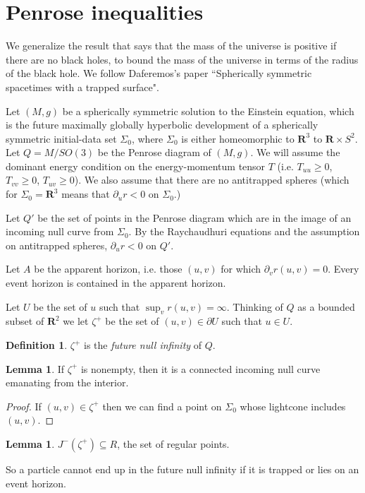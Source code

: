 \documentclass[12pt]{report}
\newcommand{\RR}{\mathbf{R}}
\newcommand{\dfn}[1]{\emph{#1}\index{#1}}
\theoremstyle{definition}
\newtheorem{lemma}[theorem]{Lemma}
\newtheorem{definition}[theorem]{Definition}
\theoremstyle{remark}
\begin{document}
\section{Penrose inequalities}
We generalize the result that says that the mass of the universe is positive if there are no black holes, to bound the mass of the universe in terms of the radius of the black hole. We follow Daferemos's paper ``Spherically symmetric spacetimes with a trapped surface".

Let $(M, g)$ be a spherically symmetric solution to the Einstein equation, which is the future maximally globally hyperbolic development of a spherically symmetric initial-data set $\Sigma_0$, where $\Sigma_0$ is either homeomorphic to $\RR^3$ to $\RR \times S^2$. Let $Q = M/SO(3)$ be the Penrose diagram of $(M, g)$. We will assume the dominant energy condition on the energy-momentum tensor $T$ (i.e. $T_{uu} \geq 0$, $T_{vv} \geq 0$, $T_{uv} \geq 0$). We also assume that there are no antitrapped spheres (which for $\Sigma_0 = \RR^3$ means that $\partial_ur < 0$ on $\Sigma_0$.)

Let $Q'$ be the set of points in the Penrose diagram which are in the image of an incoming null curve from $\Sigma_0$. By the Raychaudhuri equations and the assumption on antitrapped spheres, $\partial_ur < 0$ on $Q'$.

Let $A$ be the apparent horizon, i.e. those $(u, v)$ for which $\partial_vr(u, v) = 0$. Every event horizon is contained in the apparent horizon.

Let $U$ be the set of $u$ such that $\sup_v r(u, v) = \infty$. Thinking of $Q$ as a bounded subset of $\RR^2$ we let $\zeta^+$ be the set of $(u,v) \in \partial U$ such that $u \in U$.
\begin{definition}
    $\zeta^+$ is the \dfn{future null infinity} of $Q$.
\end{definition}
\begin{lemma}
    If $\zeta^+$ is nonempty, then it is a connected incoming null curve emanating from the interior.
\end{lemma}
\begin{proof}
    If $(u, v) \in \zeta^+$ then we can find a point on $\Sigma_0$ whose lightcone includes $(u, v)$.
\end{proof}
\begin{lemma}
    $J^-(\zeta^+) \subseteq R$, the set of regular points.
\end{lemma}
    So a particle cannot end up in the future null infinity if it is trapped or lies on an event horizon.
\end{document}
